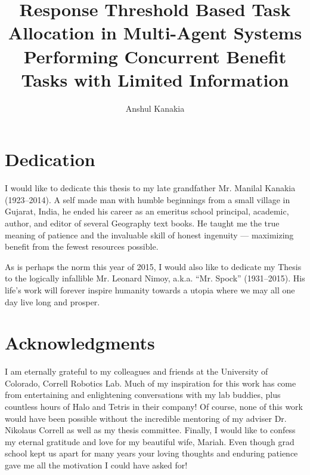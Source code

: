 \documentclass[12pt]{book}
\begin{document}
\pagestyle{titleStyle}
\title{Response Threshold Based Task Allocation in Multi-Agent Systems Performing Concurrent Benefit Tasks with Limited Information}
\author{Anshul Kanakia}
\date{}
\maketitle

%
%
%
%

\chapter*{Dedication}
I would like to dedicate this thesis to my late grandfather Mr. Manilal Kanakia (1923--2014). A self made man with humble beginnings from a small village in Gujarat, India, he ended his career as an emeritus school principal, academic, author, and editor of several Geography text books. He taught me the true meaning of patience and the invaluable skill of honest ingenuity --- maximizing benefit from the fewest resources possible.

As is perhaps the norm this year of 2015, I would also like to dedicate my Thesis to the logically infallible Mr. Leonard Nimoy, a.k.a. ``Mr. Spock'' (1931--2015). His life's work will forever inspire humanity towards a utopia where we may all one day live long and prosper.

\chapter*{Acknowledgments}
I am eternally grateful to my colleagues and friends at the University of Colorado, Correll Robotics Lab. Much of my inspiration for this work has come from entertaining and enlightening conversations with my lab buddies, plus countless hours of Halo and Tetris in their company! Of course, none of this work would have been possible without the incredible mentoring of my adviser Dr. Nikolaus Correll as well as my thesis committee. Finally, I would like to confess my eternal gratitude and love for my beautiful wife, Mariah. Even though grad school kept us apart for many years your loving thoughts and enduring patience gave me all the motivation I could have asked for!
\end{document}
